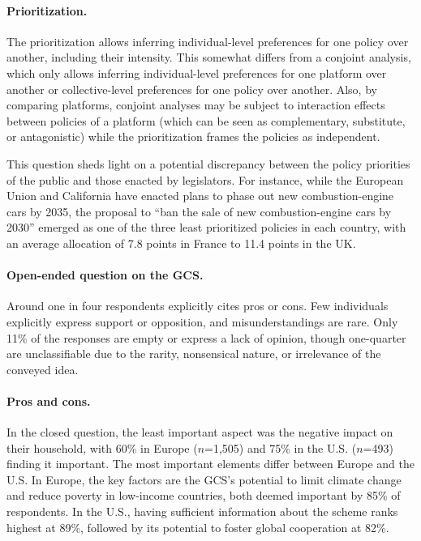 \documentclass[12pt,english]{article}
\begin{document}
\begin{small}
\paragraph{\small Prioritization.}
The prioritization allows inferring individual-level preferences for one policy over another, including their intensity. This somewhat differs from a conjoint analysis, which only allows inferring individual-level preferences for one platform over another or collective-level preferences for one policy over another. Also, by comparing platforms, conjoint analyses may be subject to interaction effects between policies of a platform (which can be seen as complementary, substitute, or antagonistic) while the prioritization frames the policies as independent.

This question sheds light on a potential discrepancy between the policy priorities of the public and those enacted by legislators. For instance, while the European Union and California have enacted plans to phase out new combustion-engine cars by 2035, the proposal to ``ban the sale of new combustion-engine cars by 2030'' emerged as one of the three least prioritized policies in each country, with an average allocation of 7.8 points in France to 11.4 points in the UK.

\paragraph{\small Open-ended question on the GCS.}
Around one in four respondents explicitly cites pros or cons. Few individuals explicitly express support or opposition, and misunderstandings are rare. Only 11\% of the responses are empty or express a lack of opinion, though one-quarter are unclassifiable due to the rarity, nonsensical nature, or irrelevance of the conveyed idea.

\paragraph{\small Pros and cons.}
In the closed question, the least important aspect was the negative impact on their household, with 60\% in Europe ($n$=1,505) and 75\% in the U.S. ($n$=493) finding it important. The most important elements differ between Europe and the U.S. In Europe, the key factors are the GCS's potential to limit climate change and reduce poverty in low-income countries, both deemed important by 85\% of respondents. In the U.S., having sufficient information about the scheme ranks highest at 89\%, followed by its potential to foster global cooperation at 82\%. 


\end{small}
\end{document}
